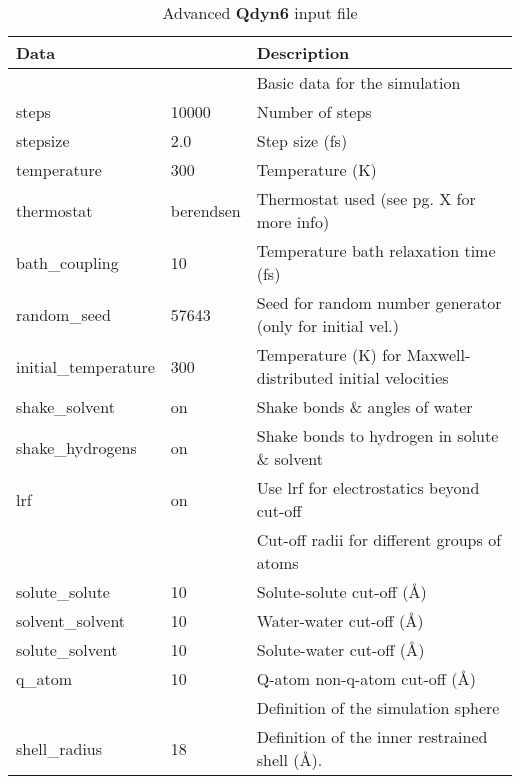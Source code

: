 \documentclass[a4paper,11pt]{article}
\begin{document}
\begin{longtable}{|p{105pt} p{60pt}|p{235pt}|}
\caption{Advanced \textbf{Qdyn6} input file} \\
  \hline \textbf{Data}            &              & \textbf{Description} \\
  \endhead
  \hline [MD]                     &              & Basic data for the simulation \\
  \hline steps                    & 10000        & Number of steps \\
  \hline stepsize                 & 2.0          & Step size (fs) \\
  \hline temperature              & 300          & Temperature (K) \\
  \hline thermostat               & berendsen    & Thermostat used (see pg. X for more info) \\
  \hline bath{\_}coupling         & 10           & Temperature bath relaxation time (fs) \\
  \hline random{\_}seed           & 57643        & Seed for random number generator (only for initial vel.) \\
  \hline initial{\_}temperature   & 300          & Temperature (K) for Maxwell-distributed initial velocities\\
  \hline shake{\_}solvent         & on           & Shake bonds \& angles of water \\
  \hline shake{\_}hydrogens       & on           & Shake bonds to hydrogen in solute \& solvent \\
  \hline lrf                      & on           & Use lrf for electrostatics beyond cut-off \\
  \hline [cut-offs]               &              & Cut-off radii for different groups of atoms \\
	\hline solute{\_}solute         & 10           & Solute-solute cut-off ({\AA}) \\
	\hline solvent{\_}solvent       & 10           & Water-water cut-off ({\AA}) \\
	\hline solute{\_}solvent        & 10           & Solute-water cut-off ({\AA}) \\
	\hline q{\_}atom                & 10           & Q-atom non-q-atom cut-off ({\AA}) \\
  \hline [sphere]                 &              & Definition of the simulation sphere \\
	\hline shell{\_}radius          & 18           & Definition of the inner restrained shell ({\AA}). \\

\end{longtable}
\end{document}

